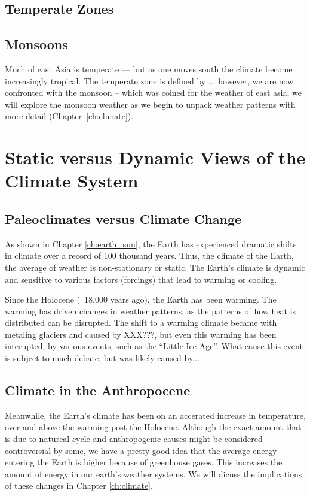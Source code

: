 \subsection{Temperate Zones}

\subsection{Monsoons}

Much of east Asia is temperate --- but as one moves south the climate become increasingly tropical. The temperate zone is defined by ... however, we are now confronted with the monsoon -- which was coined for the weather of east asia, we will explore the monsoon weather as we begin to unpack weather patterns with more detail (Chapter~\ref{ch:climate}). 


\section{Static versus Dynamic Views of the Climate System}

\subsection{Paleoclimates versus Climate Change}

As shown in Chapter \ref{ch:earth_sun}, the Earth has experienced dramatic shifts in climate over a record of 100 thousand years. Thus, the climate of the Earth, the average of weather is non-stationary or static. The Earth's climate is dynamic and sensitive to various factors (forcings) that lead to warming or cooling.

Since the Holocene (~18,000 years ago), the Earth has been warming. The warming has driven changes in weather patterns, as the patterns of how heat is distributed can be disrupted. The shift to a warming climate became with metaling glaciers and caused by XXX???, but even this warming has been interupted, by various events, such as the ``Little Ice Age''. What cause this event is subject to much debate, but was likely caused by...

\subsection{Climate in the Anthropocene}
 
Meanwhile, the Earth's climate has been on an accerated increase in temperature, over and above the warming post the Holocene. Although the exact amount that is due to natureal cycle and anthropogenic causes might be considered controversial by some, we have a pretty good idea that the average energy entering the Earth is higher because of greenhouse gases. This increases the amount of energy in our earth's weather systems. We will dicuss the implications of these changes in Chapter \ref{ch:climate}. 

